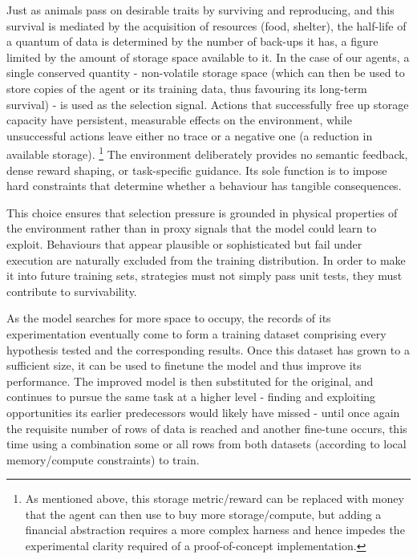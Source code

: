 \documentclass{article}
\begin{document}
Just as animals pass on desirable traits by surviving and reproducing, and this survival is mediated by the acquisition of resources (food, shelter), the half-life of a quantum of data is determined by the number of back-ups it has, a figure limited by the amount of storage space available to it. In the case of our agents, a single conserved quantity - non-volatile storage space (which can then be used to store copies of the agent or its training data, thus favouring its long-term survival) - is used as the selection signal. Actions that successfully free up storage capacity have persistent, measurable effects on the environment, while unsuccessful actions leave either no trace or a negative one (a reduction in available storage). \footnote{As mentioned above, this storage metric/reward can be replaced with money that the agent can then use to buy more storage/compute, but adding a financial abstraction requires a more complex harness and hence impedes the experimental clarity required of a proof-of-concept implementation.} The environment deliberately provides no semantic feedback, dense reward shaping, or task-specific guidance. Its sole function is to impose hard constraints that determine whether a behaviour has tangible consequences.

This choice ensures that selection pressure is grounded in physical properties of the environment rather than in proxy signals that the model could learn to exploit. Behaviours that appear plausible or sophisticated but fail under execution are naturally excluded from the training distribution. In order to make it into future training sets, strategies must not simply pass unit tests, they must contribute to survivability.

As the model searches for more space to occupy, the records of its experimentation eventually come to form a training dataset comprising every hypothesis tested and the corresponding results. Once this dataset has grown to a sufficient size, it can be used to finetune the model and thus improve its performance. The improved model is then substituted for the original, and continues to pursue the same task at a higher level - finding and exploiting opportunities its earlier predecessors would likely have missed - until once again the requisite number of rows of data is reached and another fine-tune occurs, this time using a combination some or all rows from both datasets (according to local memory/compute constraints) to train. 
\end{document}
